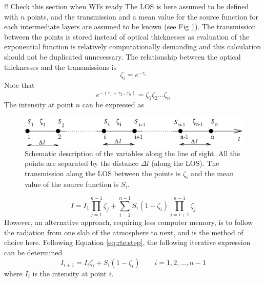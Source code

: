   
 \label{sec:rte:iter}
 
 !! Check this section when WFs ready
 The LOS is here assumed to be defined with $n$ points, and the
 transmission and a mean value for the source function for each
 intermediate layers are assumed to be known (see Fig
 \ref{fig:rte:los}).  The transmission between the points is stored
 instead of optical thicknesses as evaluation of the exponential
 function is relatively computationally demanding and this calculation
 should not be duplicated unnecessary. The relationship between
 the optical thicknesses and the transmissions is
 \begin{equation}
   \zeta_i = e^{-\tau_i}
 \end{equation}
 Note that
 \begin{equation}
   e^{-\left(\tau_1+\tau_2\dots\tau_n\right)}=\zeta_1\zeta_2\dots\zeta_n
 \end{equation}
 The intensity at point $n$ can be expressed as

  \begin{figure}[t]
    \includegraphics*[width=0.98\hsize]{Figs/los.eps}
    \caption{Schematic description of the variables along 
             the line of sight. All the points are separated by the distance
             $\Delta l$ (along the LOS). The transmission along the LOS
             between the points is $\zeta_i$ and the mean value of the source
             function is $S_i$.}  
    \label{fig:rte:los}  
  \end{figure}

 \begin{equation}
   I = I_1 \prod_{j=1}^{n-1}\zeta_j + 
       \sum_{i=1}^{n-1}S_i(1-\zeta_i)\prod_{j=i+1}^{n-1}\zeta_j
  \label{eq:rte:rteprod}
 \end{equation}
 However, an alternative approach, requiring less computer memory, is
 to follow the radiation from one slab of the atmosphere to next, and
 is the method of choice here. Following Equation \ref{eq:rte:step},
 the following iterative expression can be determined
 \citep{eriksson:97a}
 \begin{equation}
   I_{i+1} = I_i\zeta_i + S_i\left(1-\zeta_i\right)\qquad i=1,2,...,n\!\!-\!\!1
  \label{eq:rte:iteration}
 \end{equation}
 where $I_i$ is the intensity at point $i$.
 
